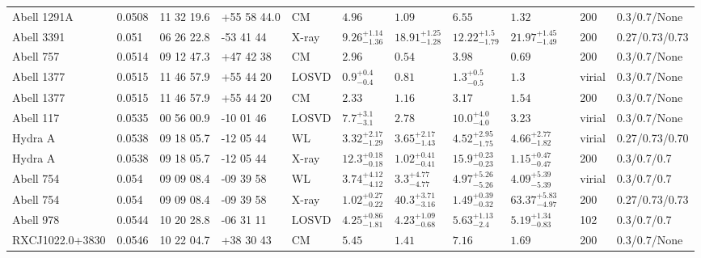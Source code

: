\begin{landscape}
\begin{center}
{\begin{longtable}{llllllllllll}
Abell 1291A & 0.0508 & 11 32 19.6 & +55 58 44.0 & CM & ${4.96}^{}_{}$ & ${1.09}^{}_{}$ & ${6.55}^{}_{}$ & ${1.32}^{}_{}$ & \citet{RI06.1} & 200 & 0.3/0.7/None \\
Abell 3391 & 0.051 & 06 26 22.8 & -53 41 44 & X-ray & ${9.26}^{+1.14}_{-1.36}$ & ${18.91}^{+1.25}_{-1.28}$ & ${12.22}^{+1.5}_{-1.79}$ & ${21.97}^{+1.45}_{-1.49}$ & \citet{BA14.1} & 200 & 0.27/0.73/0.73 \\
Abell 757 & 0.0514 & 09 12 47.3 & +47 42 38 & CM & ${2.96}^{}_{}$ & ${0.54}^{}_{}$ & ${3.98}^{}_{}$ & ${0.69}^{}_{}$ & \citet{RI06.1} & 200 & 0.3/0.7/None \\
Abell 1377 & 0.0515 & 11 46 57.9 & +55 44 20 & LOSVD & ${0.9}^{+0.4}_{-0.4}$ & ${0.81}^{}_{}$ & ${1.3}^{+0.5}_{-0.5}$ & ${1.3}^{}_{}$ & \citet{AB11.1} & virial & 0.3/0.7/None \\
Abell 1377 & 0.0515 & 11 46 57.9 & +55 44 20 & CM & ${2.33}^{}_{}$ & ${1.16}^{}_{}$ & ${3.17}^{}_{}$ & ${1.54}^{}_{}$ & \citet{RI06.1} & 200 & 0.3/0.7/None \\
Abell 117 & 0.0535 & 00 56 00.9 & -10 01 46 & LOSVD & ${7.7}^{+3.1}_{-3.1}$ & ${2.78}^{}_{}$ & ${10.0}^{+4.0}_{-4.0}$ & ${3.23}^{}_{}$ & \citet{AB11.1} & virial & 0.3/0.7/None \\
Hydra A & 0.0538 & 09 18 05.7 & -12 05 44 & WL & ${3.32}^{+2.17}_{-1.29}$ & ${3.65}^{+2.17}_{-1.43}$ & ${4.52}^{+2.95}_{-1.75}$ & ${4.66}^{+2.77}_{-1.82}$ & \citet{OK15.1} & virial & 0.27/0.73/0.70 \\
Hydra A & 0.0538 & 09 18 05.7 & -12 05 44 & X-ray & ${12.3}^{+0.18}_{-0.18}$ & ${1.02}^{+0.41}_{-0.41}$ & ${15.9}^{+0.23}_{-0.23}$ & ${1.15}^{+0.47}_{-0.47}$ & \citet{DA01.1} & 200 & 0.3/0.7/0.7 \\
Abell 754 & 0.054 & 09 09 08.4 & -09 39 58 & WL & ${3.74}^{+4.12}_{-4.12}$ & ${3.3}^{+4.77}_{-4.77}$ & ${4.97}^{+5.26}_{-5.26}$ & ${4.09}^{+5.39}_{-5.39}$ & \citet{OK08.1} & virial & 0.3/0.7/0.7 \\
Abell 754 & 0.054 & 09 09 08.4 & -09 39 58 & X-ray & ${1.02}^{+0.27}_{-0.22}$ & ${40.3}^{+3.71}_{-3.16}$ & ${1.49}^{+0.39}_{-0.32}$ & ${63.37}^{+5.83}_{-4.97}$ & \citet{BA14.1} & 200 & 0.27/0.73/0.73 \\
Abell 978 & 0.0544 & 10 20 28.8 & -06 31 11 & LOSVD & ${4.25}^{+0.86}_{-1.81}$ & ${4.23}^{+1.09}_{-0.68}$ & ${5.63}^{+1.13}_{-2.4}$ & ${5.19}^{+1.34}_{-0.83}$ & \citet{WO10.1} & 102 & 0.3/0.7/0.7 \\
RXCJ1022.0+3830 & 0.0546 & 10 22 04.7 & +38 30 43 & CM & ${5.45}^{}_{}$ & ${1.41}^{}_{}$ & ${7.16}^{}_{}$ & ${1.69}^{}_{}$ & \citet{RI06.1} & 200 & 0.3/0.7/None \\

\end{longtable}}
\end{center}
\end{landscape}
